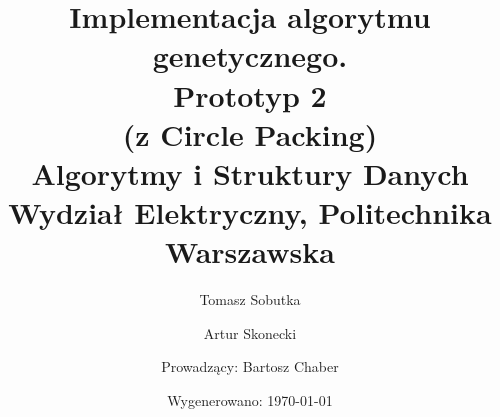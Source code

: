 \documentclass[bibtotocnumbered, headsepline,normalheadings,12pt,polish]{scrreprt}
\begin{document}
\title{\textbf{Implementacja algorytmu genetycznego.\\Prototyp 2\\(z Circle Packing)}\\
\small{Algorytmy i Struktury Danych\\ Wydział Elektryczny, Politechnika Warszawska}}
\author{Tomasz Sobutka \and Artur Skonecki \and Prowadzący: Bartosz Chaber}
\date{Wygenerowano: \today}
\maketitle


% 
%
\end{document}
